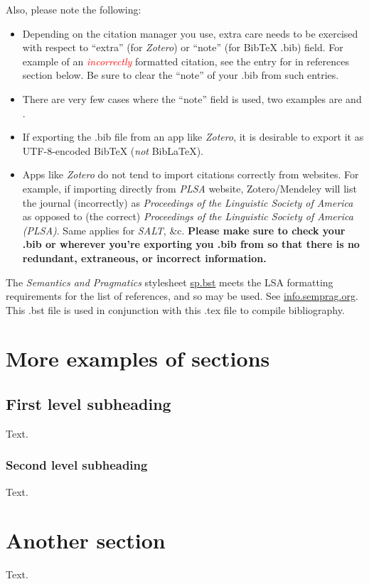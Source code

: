 \documentclass{article}
\begin{document}
Also, please note the following:
\begin{itemize}
    \item Depending on the citation manager you use, extra care needs to be exercised with respect to ``extra'' (for \textit{Zotero}) or ``note'' (for BibTeX .bib) field. For example of an \textcolor{red}{\textit{incorrectly}} formatted citation, see the entry for \cite{sankoff_formal_1981} in references section below. Be sure to clear the ``note'' of your .bib from such entries.
    \item There are very few cases where the ``note'' field is used, two examples are \cite{ozernyi_linguistic_2022} and \cite{ozernyi_rise_2022}. 
    \item If exporting the .bib file from an app like \textit{Zotero}, it is desirable to export it as UTF-8-encoded BibTeX (\textit{not} BibLaTeX).
    \item Apps like \textit{Zotero} do not tend to import citations correctly from websites. For example, if importing directly from \textit{PLSA} website, Zotero/Mendeley will list the journal (incorrectly) as \textit{Proceedings of the Linguistic Society of America} as opposed to (the correct) \textit{Proceedings of the Linguistic Society of America (PLSA)}. Same applies for \textit{SALT}, \&c. \textbf{Please make sure to check your .bib or wherever you're exporting you .bib from so that there is no redundant, extraneous, or incorrect information.} 
\end{itemize}

The \textit{Semantics and Pragmatics} stylesheet \href{https://raw.githubusercontent.com/semprag/tex/master/sp.bst}{sp.bst} meets the LSA formatting requirements for the list of references, and so may be used. See \href{http://info.semprag.org}{info.semprag.org}. This .bst file is used in conjunction with this .tex file to compile bibliography. 

\section{More examples of sections}
\subsection{First level subheading}
Text.
\subsubsection{Second level subheading} 
Text.
\section{Another section}
Text.
\end{document}
